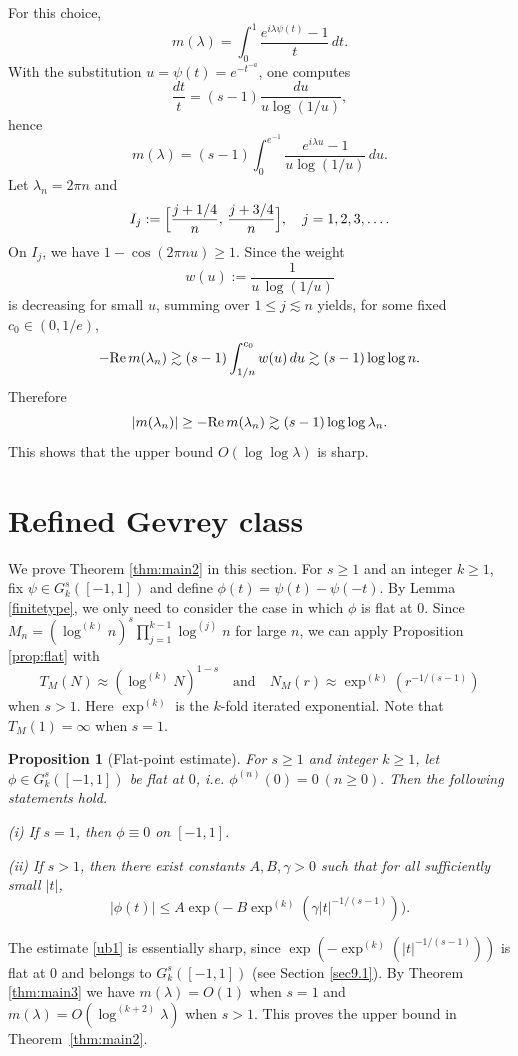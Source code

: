 \documentclass[11pt]{amsart}
\newtheorem{proposition}[theorem]{Proposition}
\newcommand{\la}{\lambda}
\renewcommand{\Re}{ {\rm Re}\,}
\newcommand{\ls}{\lesssim}
\newcommand{\gs}{\gtrsim}
\newcommand{\1}{{\rm 1\hspace*{-0.4ex}%
			\rule{0.1ex}{1.52ex}\hspace*{0.2ex}}}
\numberwithin{equation}{section}
\begin{document}
For this choice,
\[
m(\lambda)
=
\int_0^1 \frac{e^{i\lambda\psi(t)}-1}{t}\,dt.
\]
With the substitution $u=\psi(t)=e^{-t^{-a}}$, one computes
\[
\frac{dt}{t}=(s-1)\frac{du}{u\log(1/u)},
\]
hence
\[
m(\lambda)
=
(s-1)\int_0^{e^{-1}}
\frac{e^{i\lambda u}-1}{u\log(1/u)}\,du.
\]
Let $\lambda_n=2\pi n$ and
\[
I_j:=\Bigl[\frac{j+1/4}{n},\,\frac{j+3/4}{n}\Bigr],\quad j=1,2,3,\dots.
\]
On \(I_j\), we have \(1-\cos(2\pi n u)\ge 1\).
Since the weight
\[
w(u):=
\frac1{u\,\log(1/u)}
\]
is decreasing for small \(u\), summing over \(1\le j\ls n\) yields, for some fixed $c_0\in (0,1/e)$,
\[
-\Re m(\lambda_n)
\gtrsim
(s-1)\int_{1/n}^{c_0} w(u)\,du\gs (s-1)\log\log n.
\]
Therefore
\[
|m(\lambda_n)|\ge -\Re m(\lambda_n) \gtrsim (s-1)\log\log \lambda_n.
\]
This shows that the upper bound $O(\log\log\la)$ is sharp.


\section{Refined Gevrey class}\label{sec6}
We prove Theorem \ref{thm:main2} in this section. For $s\ge1$ and an integer $k\ge1$, fix $\psi\in G_k^s([-1,1])$ and define $\phi(t)=\psi(t)-\psi(-t)$. By Lemma \ref{finitetype}, we only need to consider the case in which $\phi$ is flat at $0$. Since $M_n=(\log^{(k)} n)^s\prod_{j=1}^{k-1}\log^{(j)} n$ for large $n$, we can apply Proposition \ref{prop:flat} with 
$$T_M(N)\approx (\log^{(k)}N)^{1-s}\quad \text{and}\quad N_M(r)\approx \exp^{(k)}(r^{-1/(s-1)})$$ 
when $s>1$. Here $\exp^{(k)}$ is the $k$-fold iterated exponential. Note that $T_M(1)=\infty$ when $s=1$.

\begin{proposition}[Flat-point estimate]\label{prop1}
	For $s\ge1$ and integer $k\ge1$, let $\phi\in G_k^s([-1,1])$ be flat at $0$, i.e. $\phi^{(n)}(0)=0\ (n\ge 0).$
	Then the following statements hold.
	
	\smallskip
	\noindent
	\textup{(i)} If $s=1$, then $\phi\equiv 0$ on $[-1,1]$.
	
	\smallskip
	\noindent
	\textup{(ii)} If $s>1$, then there exist constants $A,B,\gamma>0$ such that for all sufficiently small $|t|$,
	\begin{equation}\label{ub1}
		|\phi(t)|\le A\exp\bigl(-B \exp^{(k)}(\gamma |t|^{-1/(s-1)})\bigr).
	\end{equation}
\end{proposition}
The estimate \eqref{ub1} is essentially sharp, since $\exp(-\exp^{(k)}(|t|^{-1/(s-1)}))$ is flat at $0$ and belongs to $G_k^s([-1,1])$ (see Section \ref{sec9.1}). By Theorem \ref{thm:main3} we have $m(\la)=O(1)$ when $s=1$ and $m(\la)=O(\log^{(k+2)}\la)$ when $s>1$.
This proves the upper bound in Theorem~\ref{thm:main2}.
\end{document}
